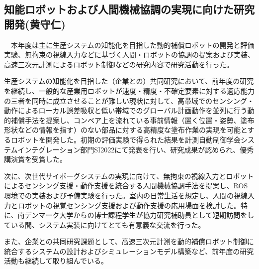 \subsection{知能ロボットおよび人間機械協調の実現に向けた研究開発(黄守仁)}

　本年度は主に生産システムの知能化を目指した動的補償ロボットの開発と評価実験、無拘束の視線入力などに基づく人間・ロボットの協調の提案および実装、高速三次元計測によるロボット制御などの研究内容で研究活動を行った。

生産システムの知能化を目指した（企業との）共同研究において、前年度の研究を継続し、一般的な産業用ロボットが速度・精度・不確定要素に対する適応能力の三者を同時に成立させることが難しい現状に対して、高帯域でのセンシング・動作によるローカル誤差吸収と低い帯域でのグローバル計画動作を並列に行う動的補償手法を提案し、コンベア上を流れている事前情報（置く位置・姿勢、塗布形状などの情報を指す）のない部品に対する高精度な塗布作業の実現を可能とするロボットを開発した。初期の評価実験で得られた結果を計測自動制御学会システムインテグレーション部門SI2022にて発表を行い、研究成果が認められ、優秀講演賞を受賞した。

次に、次世代サイボーグシステムの実現に向けて、無拘束の視線入力とロボットによるセンシング支援・動作支援を統合する人間機械協調手法を提案し、ROS環境での実装および予備実験を行った。室内の日常生活を想定し、人間の視線入力とロボットの視覚センシング支援および動作支援の応用場面を検討した。特に、南デンマーク大学からの博士課程学生が協力研究補助員として短期訪問をしている間、システム実装に向けてとても有意義な交流を行った。

また、企業との共同研究課題として、高速三次元計測を動的補償ロボット制御に統合するシステムの設計およびシミュレーションモデル構築など、前年度の研究活動も継続して取り組んでいる。
